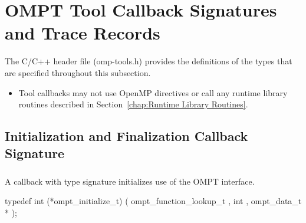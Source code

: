 \newcommand{\epdesc}{
The \plc{endpoint} argument indicates that the callback is invoked
at the beginning of a scope or the end of a scope.
}

\newcommand\codeptrdesc{
The \plc{codeptr_ra} argument relates the implementation of an 
OpenMP region to its source code. If a runtime routine implements 
the region associated with this callback then \plc{codeptr_ra} 
should contain the return address of the call to the runtime routine.  
If the implementation of this feature is inlined, \plc{codeptr_ra} 
should contain the return address of the invocation of this callback.  
If attribution to source code is impossible or inappropriate,
\plc{codeptr_ra} may be \code{NULL}.
}


\section{OMPT Tool Callback Signatures and Trace Records}
\label{sec:ompt-tool-callbacks}

The C/C++ header file (omp-tools.h) provides the definitions of 
the types that are specified throughout this subsection.

\restrictions
\begin{itemize}
\item Tool callbacks may not use OpenMP directives or call any runtime 
      library routines described in Section~\ref{chap:Runtime Library Routines}.
\end{itemize}

\subsection{Initialization and Finalization Callback Signature}

\subsubsection{}
\label{sec:ompt_initialize_t}

\summary
A callback with type signature  initializes 
use of the OMPT interface.

\format

\begin{ccppspecific}
\begin{omptInquiry}
typedef int (*ompt_initialize_t) (
  ompt_function_lookup_t ,
  int ,
  ompt_data_t *
);
\end{omptInquiry}
\end{ccppspecific}


